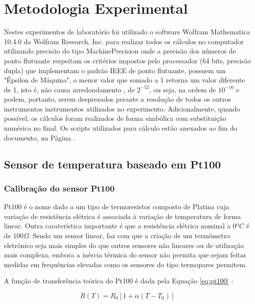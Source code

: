 \documentclass[a4paper]{instrumentacao}
\begin{document}
\chapter{Metodologia Experimental}

Nestes experimentos de laboratório foi utilizado o software Wolfram Mathematica 10.4.0 da Wolfram Research, Inc. para realizar todos os cálculos no computador utilizando precisão do tipo MachinePrecision\cite{mathematica-numerial-precision} onde a precisão dos números de ponto flutuante respeitam os critérios impostos pelo processador (64 bits, precisão dupla) que implementam o padrão IEEE de ponto flutuante, possuem um "Épsilon de Máquina", o menor valor que somado a 1 retorna um valor diferente de 1, isto é, não causa arredondamento \cite{wikipedia-epsilon}, de $2^{-52}$, ou seja, na ordem de $10^{-16}$ e podem, portanto, serem desprezados perante a resolução de todos os outros instrumentos instrumentos utilizados no experimento. Adicionalmente, quando possível, os cálculos foram realizados de forma simbólica com substituição numérica no final. Os scripts utilizados para cálculo estão anexados ao fim do documento, na Página \pageref{ch:attachments}.

\section{Sensor de temperatura baseado em Pt100}
\label{ch:pt100}

\subsection{Calibração do sensor Pt100}
\label{sec:resistencia-pt100}

Pt100 é o nome dado a um tipo de termoresistor composto de Platina cuja variação de resistência elétrica é associada à variação de temperatura de forma linear. Outra caraterística importante é que a resistência elétrica nominal a $0ºC$ é de $100 \Omega$. Sendo um sensor linear, faz com que a criação de um termômetro eletrônico seja mais simples do que outros sensores não lineares ou de utilização mais complexa, embora a inércia térmica do sensor não permita que sejam feitas medidas em frequências elevadas como os sensores do tipo termopares permitem.

A função de transferência teórica do Pt100 é dada pela Equação \ref{eq:pt100} \cite{livro-texto}:

\begin{equation}
	R(T) = R_0 \left[1 + \alpha\left(T - T_0\right)\right]
	\label{eq:pt100}
\end{equation}
\end{document}

